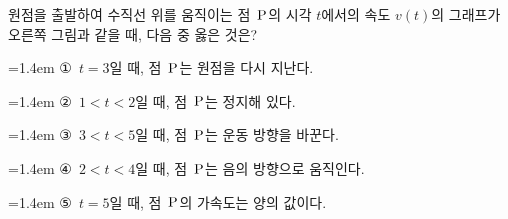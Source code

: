 \noindent\begin{minipage}[t]{0.58\linewidth}\vspace{0pt}\raggedright 원점을 출발하여 수직선 위를 움직이는 점~$\mathrm{P}$의 시각 $t$에서의 속도 $v(t)$의 그래프가 오른쪽 그림과 같을 때, 다음 중 옳은 것은?\end{minipage}\hfill\begin{minipage}[t]{0.4\linewidth}\vspace{0pt}\centering \resizebox{\ifdim\width>\linewidth\linewidth\else\width\fi}{!}{}\end{minipage}\par
\par\medskip\par\noindent\hangindent=1.4em {\small ①}\ $t=3$일 때, 점~$\mathrm{P}$는 원점을 다시 지난다.\par\noindent\hangindent=1.4em {\small ②}\ $1<t<2$일 때, 점~$\mathrm{P}$는 정지해 있다.\par\noindent\hangindent=1.4em {\small ③}\ $3<t<5$일 때, 점~$\mathrm{P}$는 운동 방향을 바꾼다.\par\noindent\hangindent=1.4em {\small ④}\ $2<t<4$일 때, 점~$\mathrm{P}$는 음의 방향으로 움직인다.\par\noindent\hangindent=1.4em {\small ⑤}\ $t=5$일 때, 점~$\mathrm{P}$의 가속도는 양의 값이다.\par\medskip
